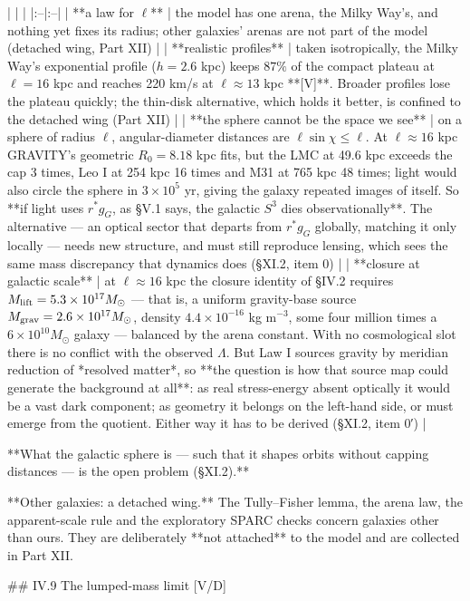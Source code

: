 | | |
|:--|:--|
| **a law for $\ell$** | the model has one arena, the Milky Way's, and nothing yet fixes its radius; other galaxies' arenas are not part of the model (detached wing, Part XII) |
| **realistic profiles** | taken isotropically, the Milky Way's exponential profile ($h = 2.6$ kpc) keeps $87\%$ of the compact plateau at $\ell = 16$ kpc and reaches 220 km/s at $\ell\approx13$ kpc **[V]**. Broader profiles lose the plateau quickly; the thin-disk alternative, which holds it better, is confined to the detached wing (Part XII) |
| **the sphere cannot be the space we see** | on a sphere of radius $\ell$, angular-diameter distances are $\ell\sin\chi\leq\ell$. At $\ell\approx16$ kpc GRAVITY's geometric $R_0 = 8.18$ kpc fits, but the LMC at 49.6 kpc exceeds the cap 3 times, Leo I at 254 kpc 16 times and M31 at 765 kpc 48 times; light would also circle the sphere in $3\times10^5$ yr, giving the galaxy repeated images of itself. So **if light uses $r^*g_G$, as §V.1 says, the galactic $S^3$ dies observationally**. The alternative — an optical sector that departs from $r^*g_G$ globally, matching it only locally — needs new structure, and must still reproduce lensing, which sees the same mass discrepancy that dynamics does (§XI.2, item 0) |
| **closure at galactic scale** | at $\ell\approx16$ kpc the closure identity of §IV.2 requires $M_{\rm lift} = 5.3\times10^{17}M_\odot$ — that is, a uniform gravity-base source $M_{\rm grav} = 2.6\times10^{17}M_\odot$, density $4.4\times10^{-16}$ kg m$^{-3}$, some four million times a $6\times10^{10}M_\odot$ galaxy — balanced by the arena constant. With no cosmological slot there is no conflict with the observed $\Lambda$. But Law I sources gravity by meridian reduction of *resolved matter*, so **the question is how that source map could generate the background at all**: as real stress-energy absent optically it would be a vast dark component; as geometry it belongs on the left-hand side, or must emerge from the quotient. Either way it has to be derived (§XI.2, item 0′) |

**What the galactic sphere is — such that it shapes orbits without capping distances — is the open problem (§XI.2).**

**Other galaxies: a detached wing.** The Tully–Fisher lemma, the arena law, the apparent-scale rule and the exploratory SPARC checks concern galaxies other than ours. They are deliberately **not attached** to the model and are collected in Part XII.

## IV.9 The lumped-mass limit [V/D]

